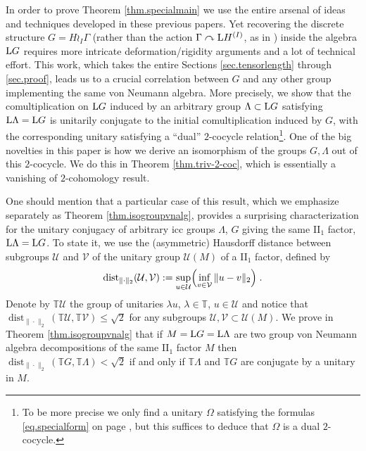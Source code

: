 \documentclass[a4paper,11pt]{amsart}
\numberwithin{equation}{section}
\begin{document}
In order to prove Theorem \ref{thm.specialmain} we use the entire
arsenal of ideas and techniques developed in these previous papers.
Yet recovering the discrete structure $G=H\wr_I \Gamma$ (rather than
the action $\Gamma \curvearrowright {\mathord{\text{\rm L}}} H^{(I)}$, as in
\cite{Po04,PV09,Io10}) inside the algebra ${\mathord{\text{\rm L}}} G$ requires more
intricate deformation/rigidity arguments and a lot of technical
effort. This work, which takes the entire Sections \ref{sec.tensorlength} through \ref{sec.proof},
leads us to a crucial correlation between $G$ and any other group
implementing the same von Neumann algebra. More precisely, we show
that the comultiplication on ${\mathord{\text{\rm L}}} G$ induced by an arbitrary group
$\Lambda \subset {\mathord{\text{\rm L}}} G$ satisfying ${\mathord{\text{\rm L}}} \Lambda = {\mathord{\text{\rm L}}} G$ is
unitarily conjugate to the initial comultiplication induced by $G$,
with the corresponding unitary satisfying a ``dual'' $2$-cocycle
relation\footnote{To be more precise we only find a unitary $\Omega$
satisfying the formulas \eqref{eq.specialform} on page \pageref{eq.specialform},
but this suffices to deduce that $\Omega$ is a dual $2$-cocycle.}.
One of the big novelties in this paper is how we derive an
isomorphism of the groups $G,\Lambda$ out of this $2$-cocycle. We do
this in Theorem \ref{thm.triv-2-coc}, which is essentially a
vanishing of $2$-cohomology result.

One should mention that a particular case of this result, which we
emphasize separately as Theorem \ref{thm.isogroupvnalg}, provides a
surprising characterization for the unitary conjugacy of arbitrary
icc groups $\Lambda$, $G$ giving the same II$_1$ factor, ${\mathord{\text{\rm L}}}
\Lambda = {\mathord{\text{\rm L}}} G$. To state it, we use the (asymmetric) Hausdorff
distance between subgroups ${\mathcal{U}}$ and ${\mathcal{V}}$ of the unitary group ${\mathcal{U}}(M)$ of a II$_1$ factor,
defined by
$${\operatorname{dist}_{\|\cdot\|_2}}({\mathcal{U}},{\mathcal{V}}) := \sup_{u \in {\mathcal{U}}} \Bigl( \inf_{v \in {\mathcal{V}}} \|u-v\|_2\Bigr) \; .$$
Denote by ${\mathbb{T}} {\mathcal{U}}$ the group of unitaries $\lambda u$, $\lambda \in {\mathbb{T}}$, $u \in {\mathcal{U}}$ and
notice that ${\operatorname{dist}_{\|\cdot\|_2}}({\mathbb{T}} {\mathcal{U}},{\mathbb{T}} {\mathcal{V}}){\leqslant} \sqrt{2}$ for any subgroups
${\mathcal{U}}, {\mathcal{V}} \subset {\mathcal{U}}(M)$. We prove in Theorem
\ref{thm.isogroupvnalg} that if $M={\mathord{\text{\rm L}}} G = {\mathord{\text{\rm L}}} \Lambda$ are two
group von Neumann algebra decompositions of the same II$_1$ factor
$M$ then ${\operatorname{dist}_{\|\cdot\|_2}}({\mathbb{T}} G, {\mathbb{T}} \Lambda) < \sqrt{2}$ if and only if ${\mathbb{T}}
\Lambda$ and ${\mathbb{T}} G$ are conjugate by a unitary in $M$.
\end{document}
